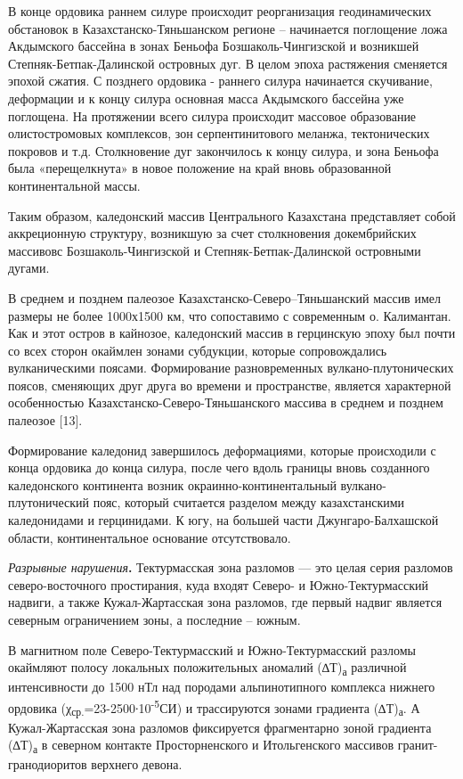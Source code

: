 \begin{multicols}{2}
В конце ордовика раннем силуре происходит реорганизация геодинамических
обстановок в Казахстанско-Тяньшанском регионе -- начинается поглощение
ложа Акдымского бассейна в зонах Беньофа Бозшаколь-Чингизской и
возникшей Степняк-Бетпак-Далинской островных дуг. В целом эпоха
растяжения сменяется эпохой сжатия. С позднего ордовика - раннего силура
начинается скучивание, деформации и к концу силура основная масса
Акдымского бассейна уже поглощена. На протяжении всего силура происходит
массовое образование олистостромовых комплексов, зон серпентинитового
меланжа, тектонических покровов и т.д. Столкновение дуг закончилось к
концу силура, и зона Беньофа была «перещелкнута» в новое положение на
край вновь образованной континентальной массы.

Таким образом, каледонский массив Центрального Казахстана представляет
собой аккреционную структуру, возникшую за счет столкновения
докембрийских массивовс Бозшаколь-Чингизской и Степняк-Бетпак-Далинской
островными дугами.

В среднем и позднем палеозое Казахстанско-Северо--Тяньшанский массив
имел размеры не более 1000х1500 км, что сопоставимо с современным о.
Калимантан. Как и этот остров в кайнозое, каледонский массив в
герцинскую эпоху был почти со всех сторон окаймлен зонами субдукции,
которые сопровождались вулканическими поясами. Формирование
разновременных вулкано-плутонических поясов, сменяющих друг друга во
времени и пространстве, является характерной особенностью
Казахстанско-Северо-Тяньшанского массива в среднем и позднем палеозое
{[}13{]}.

Формирование каледонид завершилось деформациями, которые происходили с
конца ордовика до конца силура, после чего вдоль границы вновь
созданного каледонского континента возник окраинно-континентальный
вулкано-плутонический пояс, который считается разделом между
казахстанскими каледонидами и герцинидами. К югу, на большей части
Джунгаро-Балхашской области, континентальное основание отсутствовало.

\emph{Разрывные нарушения}{\bfseries .} Тектурмасская зона разломов --- это
целая серия разломов северо-восточного простирания, куда входят Северо-
и Южно-Тектурмасский надвиги, а также Кужал-Жартасская зона разломов,
где первый надвиг является северным ограничением зоны, а последние --
южным.

В магнитном поле Северо-Тектурмасский и Южно-Тектурмасский разломы
окаймляют полосу локальных положительных аномалий (∆Т)\textsubscript{а}
различной интенсивности до 1500 нТл над породами альпинотипного
комплекса нижнего ордовика
(χ\textsubscript{ср.}=23-2500∙10\textsuperscript{-5}СИ) и трассируются
зонами градиента (∆Т)\textsubscript{а}. А Кужал-Жартасская зона разломов
фиксируется фрагментарно зоной градиента (∆Т)\textsubscript{а} в
северном контакте Просторненского и Итольгенского массивов
гранит-гранодиоритов верхнего девона.


\end{multicols}
